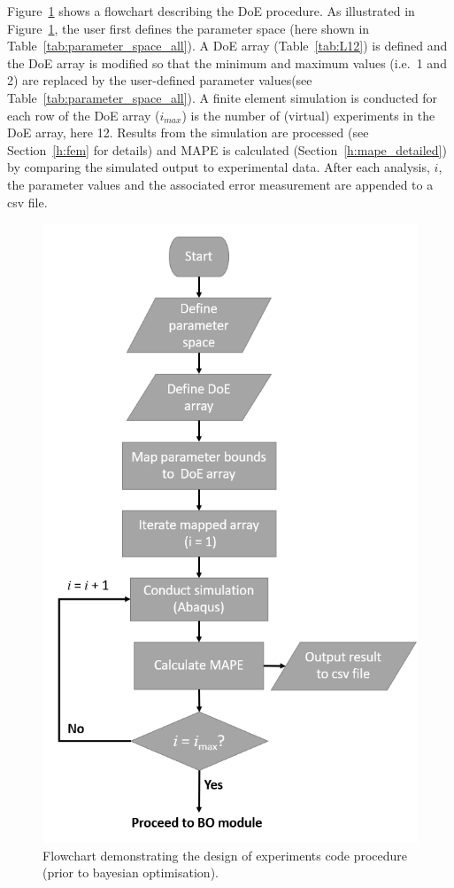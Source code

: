 \documentclass[preprint, review, 12pt]{elsarticle}
\begin{document}
	

	Figure~\ref{fig:doe_flowchart} shows a flowchart describing the DoE procedure.
	As illustrated in Figure~\ref{fig:doe_flowchart}, the user first defines the parameter space (here shown in Table~\ref{tab:parameter_space_all}).
	A DoE array (Table~\ref{tab:L12}) is defined and the DoE array is modified so that the minimum and maximum values (i.e.\ 1 and 2) are replaced by the user-defined parameter values(see Table~\ref{tab:parameter_space_all}).
	A finite element simulation is conducted for each row of the DoE array ($i_{max}$) is the number of (virtual) experiments in the DoE array, here 12.
	Results from the simulation are processed (see Section~\ref{h:fem} for details) and MAPE is calculated (Section~\ref{h:mape_detailed}) by comparing the simulated output to experimental data.
	After each analysis, $i$, the parameter values and the associated error measurement are appended to a csv file.

	\begin{figure}[!htbp]
		\centering
		\includegraphics[width=\linewidth, height=0.8\textheight, keepaspectratio]{DOE_FLOWCHART}
		\caption{Flowchart demonstrating the design of experiments code procedure (prior to bayesian optimisation).}
		\label{fig:doe_flowchart}
	\end{figure}
\end{document}
